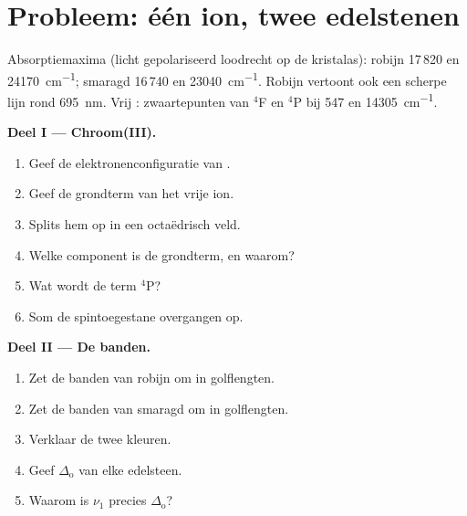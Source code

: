 \section{Probleem: één ion, twee edelstenen}

\begin{problem}
\label{pb:b3:complex-spectra-magnetism:1}
Absorptiemaxima (licht gepolariseerd loodrecht op de kristalas): robijn
17\,820 en \qty{24170}{cm^{-1}}; smaragd 16\,740 en \qty{23040}{cm^{-1}}. Robijn vertoont ook een scherpe
lijn rond \qty{695}{nm}. Vrij : zwaartepunten van $^4$F en $^4$P bij 547 en \qty{14305}{cm^{-1}}.

\medskip\noindent\textbf{Deel I --- Chroom(III).}
\begin{enumerate}
  \item Geef de elektronenconfiguratie van .
  \item Geef de grondterm van het vrije ion.
  \item Splits hem op in een octaëdrisch veld.
  \item Welke component is de grondterm, en waarom?
  \item Wat wordt de term $^4$P?
  \item Som de spintoegestane overgangen op.
\end{enumerate}

\medskip\noindent\textbf{Deel II --- De banden.}
\begin{enumerate}[resume]
  \item Zet de banden van robijn om in golflengten.
  \item Zet de banden van smaragd om in golflengten.
  \item Verklaar de twee kleuren.
  \item Geef $\Delta_{\mathrm o}$ van elke edelsteen.
  \item Waarom is $\nu_1$ precies $\Delta_{\mathrm o}$?
\end{enumerate}


\end{problem}

